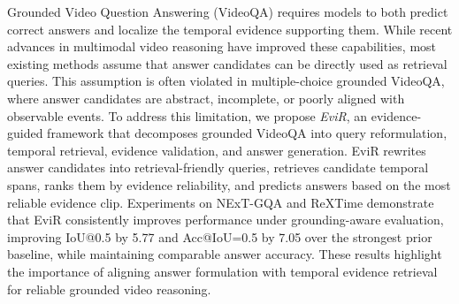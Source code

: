 Grounded Video Question Answering (VideoQA) requires models to both predict correct answers and localize the temporal evidence supporting them. While recent advances in multimodal video reasoning have improved these capabilities, most existing methods assume that answer candidates can be directly used as retrieval queries. This assumption is often violated in multiple-choice grounded VideoQA, where answer candidates are abstract, incomplete, or poorly aligned with observable events. To address this limitation, we propose \emph{EviR}, an evidence-guided framework that decomposes grounded VideoQA into query reformulation, temporal retrieval, evidence validation, and answer generation. EviR rewrites answer candidates into retrieval-friendly queries, retrieves candidate temporal spans, ranks them by evidence reliability, and predicts answers based on the most reliable evidence clip. Experiments on NExT-GQA and ReXTime demonstrate that EviR consistently improves performance under grounding-aware evaluation, improving IoU@0.5 by 5.77 and Acc@IoU=0.5 by 7.05 over the strongest prior baseline, while maintaining comparable answer accuracy. These results highlight the importance of aligning answer formulation with temporal evidence retrieval for reliable grounded video reasoning.
